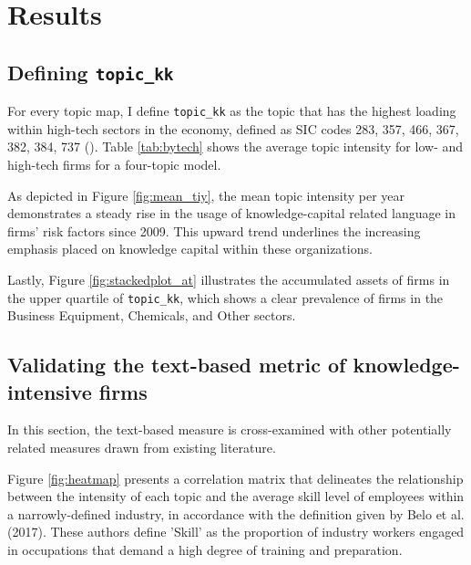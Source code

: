 \documentclass[12pt, letterpaper]{article}
\begin{document}



\section{Results}

\subsection{Defining \texttt{topic\_kk}}

For every topic map, I define \texttt{topic\_kk} as the topic that has the highest loading within high-tech sectors in the economy, defined as SIC codes 283, 357, 466, 367, 382, 384, 737 (\cite{Brown2009-zp}). Table \ref{tab:bytech} shows the average topic intensity for low- and high-tech firms for a four-topic model. 



As depicted in Figure \ref{fig:mean_tiy}, the mean topic intensity per year demonstrates a steady rise in the usage of knowledge-capital related language in firms' risk factors since 2009. This upward trend underlines the increasing emphasis placed on knowledge capital within these organizations.

Lastly, Figure \ref{fig:stackedplot_at} illustrates the accumulated assets of firms in the upper quartile of \texttt{topic\_kk}, which shows a clear prevalence of firms in the Business Equipment, Chemicals, and Other sectors.


\subsection{Validating the text-based metric of knowledge-intensive firms}
  
In this section, the text-based measure \tkk  is cross-examined with other potentially related measures drawn from existing literature.

Figure \ref{fig:heatmap} presents a correlation matrix that delineates the relationship between the intensity of each topic and the average skill level of employees within a narrowly-defined industry, in accordance with the definition given by Belo et al. (2017). These authors define 'Skill' as the proportion of industry workers engaged in occupations that demand a high degree of training and preparation.
\end{document}
